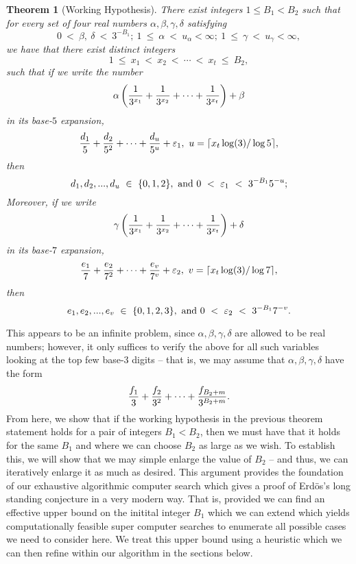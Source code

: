 \documentclass[12pt]{article}
\newtheorem{theorem}{Theorem}
\begin{document}
\begin{theorem}[Working Hypothesis] 
\label{theorem_InitialWorkingHypothesis} 
There exist integers $1 \leq B_1 < B_2$
such that for every set of four real numbers 
$\alpha, \beta,\gamma,\delta$
satisfying 
$$
0\ <\ \beta,\ \delta\ <\ 3^{-B_1};\ 1\ \leq\ \alpha\ <\ u_{\alpha} < \infty;\ 1\ \leq\ 
\gamma\ <\ u_{\gamma} < \infty,
$$
we have that there exist distinct integers 
$$
1\ \leq\ x_1\ <\ x_2\ <\ \cdots\ <\ x_t\ \leq\ B_2,
$$
such that if we write the number 
$$
\alpha \left ( {1 \over 3^{x_1}} + {1 \over 3^{x_2}} + \cdots + 
{1 \over 3^{x_t}} \right ) + \beta
$$
in its base-$5$ expansion, 
\begin{equation} 
\label{eqn_InitWorkingHyp_Base-5_cond_v1} 
{d_1 \over 5} + {d_2 \over 5^2} + \cdots + {d_u \over 5^u} + \varepsilon_1,
\ u = \lceil x_t \log(3) / \log 5\rceil,
\end{equation} 
then 
$$
d_1, d_2, ..., d_u\ \in\ \{0,1,2\},\ {\rm and\ } 0\ <\ \varepsilon_1\ <\ 
3^{-B_1} 5^{-u};
$$
Moreover, if we write
$$
\gamma \left ( {1 \over 3^{x_1}} + {1 \over 3^{x_2}} + \cdots + 
{1 \over 3^{x_t}} \right ) + \delta
$$
in its base-$7$ expansion,
\begin{equation} 
\label{eqn_InitWorkingHyp_Base-7_cond_v2}
{e_1 \over 7} + {e_2 \over 7^2} + \cdots + {e_v \over 7^v} + \varepsilon_2,
\ v = \lceil x_t \log(3)/\log 7\rceil,
\end{equation} 
then
$$
e_1, e_2, ..., e_v\ \in\ \{0,1,2,3\},\ {\rm and\ } 0\ <\ \varepsilon_2\ <\ 
3^{-B_1} 7^{-v}.
$$
\end{theorem} 

This appears to be an infinite problem, since $\alpha, \beta, \gamma, \delta$
are allowed to be real numbers; however, it only suffices to verify the
above for all such variables looking at the top few 
base-$3$ digits -- that is, we may assume that $\alpha, \beta, \gamma,
\delta$ have the form
$$
{f_1 \over 3} + {f_2 \over 3^2} + \cdots + {f_{B_2+m} \over 3^{B_2+m}}.
$$
From here, we show that if the working hypothesis in the previous theorem statement holds
for a pair of integers $B_1 < B_2$, then we must have that it holds for 
the same $B_1$ and where we can choose $B_2$ as large as we wish.  To 
establish this, we will show that we may simple enlarge the value of $B_2$ --
and thus, we can iteratively enlarge it as much as desired. 
This argument provides the foundation of our exhaustive algorithmic computer search which 
gives a proof of Erd\"os's long standing conjecture in a very modern way. That is, provided we can 
find an effective upper bound on the initital integer $B_1$ which we can extend which yields 
computationally feasible super computer searches to enumerate all possible cases we need to 
consider here. We treat this upper bound using a heuristic which we can then refine within our 
algorithm in the sections below. 
\end{document}
